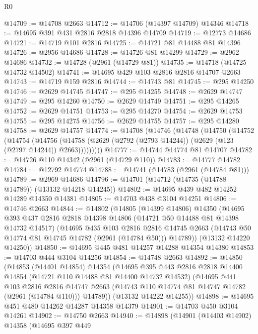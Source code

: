 \begin{lexlean}{R0}
\begin{coremodule}
@14709 := @14708 @2663
@14712 := @14706 (@14397 @14709) @14346
@14718 := @14695 @391 @431 @2816 @2818 @14396 @14709
@14719 := @12773 @14686
@14721 := @14719 @101 @2816
@14725 := @14721 @81 @14488 @81 @14396
@14726 := @2956 @14686
@14728 := @14726 @81 @14299
@14729 := @2962 @14686
@14732 := @14728 (@2961 (@14729 @81))
@14735 := @14718 (@14725 @14732 @14502)
@14741 := @14695 @429 @103 @2816 @2816 @14707 @2663
@14743 := @14719 @159 @2816
@14744 := @14743 @81
@14745 := @295 @14250
@14746 := @2629 @14745
@14747 := @295 @14255
@14748 := @2629 @14747
@14749 := @295 @14260
@14750 := @2629 @14749
@14751 := @295 @14265
@14752 := @2629 @14751
@14753 := @295 @14270
@14754 := @2629 @14753
@14755 := @295 @14275
@14756 := @2629 @14755
@14757 := @295 @14280
@14758 := @2629 @14757
@14774 := @14708
    (@14746
      (@14748
        (@14750
          (@14752
            (@14754
              (@14756
                (@14758 (@2629 (@2792 (@2793 @14244)) (@2629 (@123 (@2797 @14244)) @2663)))))))))
@14777 := @14744 @14774 @81 @14707
@14782 := @14726 @110 @14342 (@2961 (@14729 @110))
@14783 := @14777 @14782
@14784 := @12792 @14774
@14788 := @14741 (@14783 (@2961 (@14784 @81)))
@14789 := @2969 @14686
@14796 := @14701 (@14712 (@14735 (@14788 @14789)) (@13132 @14218 @14245))
@14802 := @14695 @439 @482 @14252 @14289 @14350 @14381
@14805 := @14703 @438 @3104 @14251
@14806 := @14746 @2663
@14844 := @14802
    (@14805
      (@14399 @14806)
      @14350
      (@14695
        @393
        @437
        @2816
        @2818
        @14398
        @14806
        (@14721 @50 @14488 @81 @14398 @14732 @14517)
        (@14695
          @435
          @103
          @2816
          @2816
          @14745
          @2663
          (@14743 @50 @14774 @81 @14745 @14782 (@2961 (@14784 @50)))
          @14789))
      (@13132 @14220 @14250))
@14850 := @14695 @445 @481 @14257 @14288 @14354 @14380
@14853 := @14703 @444 @3104 @14256
@14854 := @14748 @2663
@14892 := @14850
    (@14853
      (@14401 @14854)
      @14354
      (@14695
        @395
        @443
        @2816
        @2818
        @14400
        @14854
        (@14721 @110 @14488 @81 @14400 @14732 @14532)
        (@14695
          @441
          @103
          @2816
          @2816
          @14747
          @2663
          (@14743 @110 @14774 @81 @14747 @14782 (@2961 (@14784 @110)))
          @14789))
      (@13132 @14222 @14255))
@14898 := @14695 @451 @480 @14262 @14287 @14358 @14379
@14901 := @14703 @450 @3104 @14261
@14902 := @14750 @2663
@14940 := @14898
    (@14901
      (@14403 @14902)
      @14358
      (@14695
        @397
        @449

\end{coremodule}
\end{lexlean}
